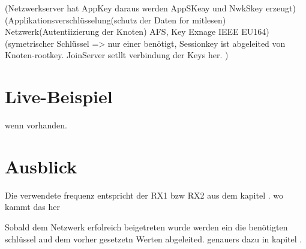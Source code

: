 \documentclass[a4paper,12pt]{article}
\begin{document}
        \cite{LoRaSecur}(Netzwerkserver hat AppKey daraus werden AppSKeay und NwkSkey erzeugt)
        \cite{WhatIsLoRa}(Applikationsverschlüsselung(schutz der Daten for mitlesen) Netzwerk(Autentiizierung der Knoten) AFS, Key Exnage IEEE EU164)
        \cite{LoRaSpec}(symetrischer Schlüssel => nur einer benötigt, Sessionkey ist abgeleited von Knoten-rootkey. JoinServer setllt verbindung der Keys her.
        )
    \section{Live-Beispiel}
        wenn vorhanden.

    \section{Ausblick}
     Die verwendete frequenz entspricht der RX1 bzw RX2 aus dem kapitel . wo kammt das her

    Sobald dem Netzwerk erfolreich beigetreten wurde werden ein die benötigten schlüssel aud dem vorher gesetzetn Werten abgeleited. genauers dazu in kapitel .
        \newpage
    
    
\end{document}
